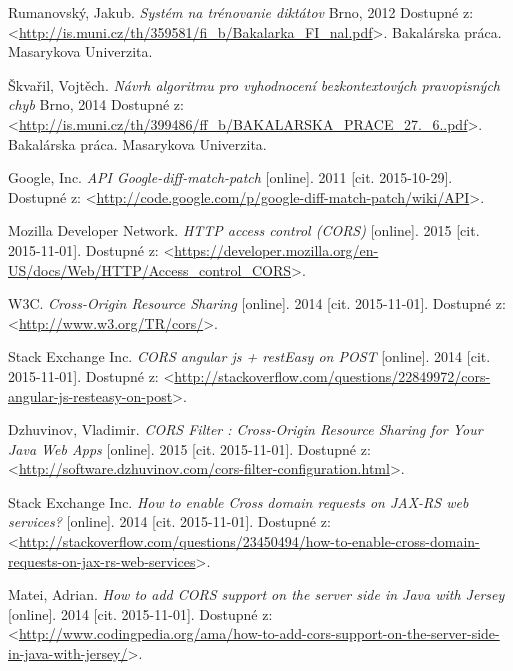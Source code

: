\documentclass[12pt,oneside]{fithesis2}
\begin{document}
\begin{thebibliography}{59}
  		Rumanovský, Jakub.
  		\emph{Systém na trénovanie diktátov}
  		Brno, 
  		2012
  		Dostupné z: <\url{http://is.muni.cz/th/359581/fi_b/Bakalarka_FI_nal.pdf}>.
  		Bakalárska práca. Masarykova Univerzita.
  		
  		Škvařil, Vojtěch.
  		\emph{Návrh algoritmu pro vyhodnocení bezkontextových pravopisných chyb}
  		Brno, 
  		2014
  		Dostupné z: <\url{http://is.muni.cz/th/399486/ff_b/BAKALARSKA_PRACE_27._6..pdf}>.
  		Bakalárska práca. Masarykova Univerzita.
  		
  		Google, Inc.
  		\emph{API Google-diff-match-patch}
  		[online].
  		2011
  		[cit. 2015-10-29].
  		Dostupné z: <\url{http://code.google.com/p/google-diff-match-patch/wiki/API}>.
  		
  		Mozilla Developer Network.
  		\emph{HTTP access control (CORS)}
  		[online].
  		2015
  		[cit. 2015-11-01].
  		Dostupné z: <\url{https://developer.mozilla.org/en-US/docs/Web/HTTP/Access_control_CORS}>.
  		
  		W3C.
  		\emph{Cross-Origin Resource Sharing}
  		[online].
  		2014
  		[cit. 2015-11-01].
  		Dostupné z: <\url{http://www.w3.org/TR/cors/}>.
  		
  		Stack Exchange Inc.
  		\emph{CORS angular js + restEasy on POST}
  		[online].
  		2014
  		[cit. 2015-11-01].
  		Dostupné z: <\url{http://stackoverflow.com/questions/22849972/cors-angular-js-resteasy-on-post}>.
		  	
  		Dzhuvinov, Vladimir.
  		\emph{CORS Filter : Cross-Origin Resource Sharing for Your Java Web Apps}
  		[online].
  		2015
  		[cit. 2015-11-01].
  		Dostupné z: <\url{http://software.dzhuvinov.com/cors-filter-configuration.html}>.	  		
 		
  		Stack Exchange Inc.
  		\emph{How to enable Cross domain requests on JAX-RS web services?}
  		[online].
  		2014
  		[cit. 2015-11-01].
  		Dostupné z: <\url{http://stackoverflow.com/questions/23450494/how-to-enable-cross-domain-requests-on-jax-rs-web-services}>.
 		
  		Matei, Adrian.
  		\emph{How to add CORS support on the server side in Java with Jersey}
  		[online].
  		2014
  		[cit. 2015-11-01].
  		Dostupné z: <\url{http://www.codingpedia.org/ama/how-to-add-cors-support-on-the-server-side-in-java-with-jersey/}>.
  		

\end{thebibliography}
\end{document}
